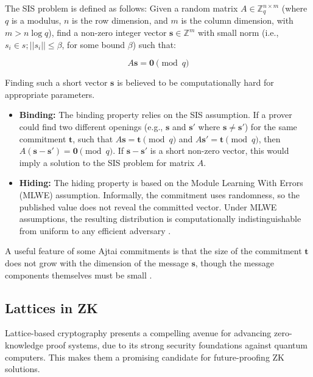 The SIS problem is defined as follows: Given a random matrix
$A \in \mathbb{Z}_q^{n \times m}$ (where $q$ is a modulus, $n$ is the row
dimension, and $m$ is the column dimension, with $m > n \log q$), find a
non-zero integer vector $\mathbf{s} \in \mathbb{Z}^m$ with small norm (i.e.,
$s_i \in s; ||s_i|| \leq \beta$, for some bound $\beta$) such that:

\begin{equation}
	A\mathbf{s} = \mathbf{0} \pmod{q}
\end{equation}

Finding such a short vector $\mathbf{s}$ is believed to be computationally
hard for appropriate parameters.

\begin{itemize}
	\item \textbf{Binding:} The binding property relies on the SIS assumption.
	      If a prover could find two different openings (e.g., $\mathbf{s}$ and
	      $\mathbf{s}'$ where $\mathbf{s} \neq \mathbf{s}'$) for the same
	      commitment $\mathbf{t}$, such that $A\mathbf{s} = \mathbf{t} \pmod{q}$
	      and $A\mathbf{s}' = \mathbf{t} \pmod{q}$, then $A(\mathbf{s} -
		      \mathbf{s}') = \mathbf{0} \pmod{q}$. If $\mathbf{s} - \mathbf{s}'$ is
	      a short non-zero vector, this would imply a solution to the SIS
	      problem for matrix $A$.
	\item \textbf{Hiding:} The hiding property is based on the Module Learning
	      With Errors (MLWE) assumption. Informally, the
	      commitment uses randomness, so the published value does not reveal
	      the committed vector. Under MLWE assumptions, the resulting
	      distribution is computationally indistinguishable from uniform to any
	      efficient adversary \cite{LatticesInZKP}.
\end{itemize}

A useful feature of some Ajtai commitments is that the size of the
commitment $\mathbf{t}$ does not grow with the dimension of the
message $\mathbf{s}$, though the message components themselves must be
small \cite{LatticesInZKP}.

\subsection{Lattices in ZK}

Lattice-based cryptography presents a compelling avenue for advancing
zero-knowledge proof systems, due to its strong security foundations
against quantum computers. This makes them a promising candidate for
future-proofing ZK solutions.

